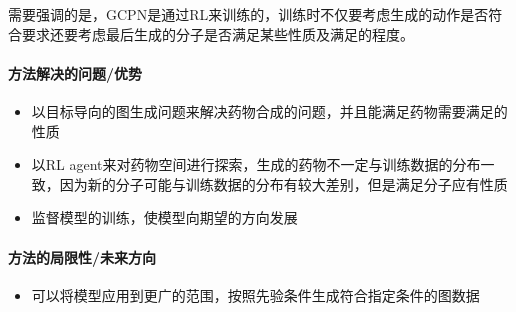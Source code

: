 需要强调的是，GCPN是通过RL来训练的，训练时不仅要考虑生成的动作是否符合要求还要考虑最后生成的分子是否满足某些性质及满足的程度。


\paragraph{方法解决的问题/优势}
\begin{itemize}
	\item 以目标导向的图生成问题来解决药物合成的问题，并且能满足药物需要满足的性质
	\item 以RL agent来对药物空间进行探索，生成的药物不一定与训练数据的分布一致，因为新的分子可能与训练数据的分布有较大差别，但是满足分子应有性质
	\item {}监督模型的训练，使模型向期望的方向发展

\end{itemize}



\paragraph{方法的局限性/未来方向}
\begin{itemize}
	\item 可以将模型应用到更广的范围，按照先验条件生成符合指定条件的图数据

\end{itemize}




